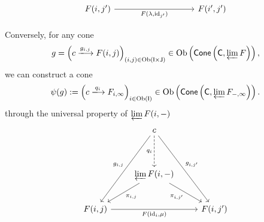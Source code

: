 \begin{prf}
\[\begin{tikzcd}
                                                                                                           &                                                                                                               &                                           &                                                                           &                                                     \\
            {F(i,j')} \arrow[rrrr, "{F(\lambda,\mathrm{id}_{j'})}"']                                       &                                                                                                               &                                           &                                                                           & {F(i',j')}                                         
            \end{tikzcd}
    \]

    \noindent Conversely, for any cone
    $$
    g=\left( c \xlongrightarrow{g_{i,j}} F(i,j)\right)_{(i,j) \in\mathrm{Ob}\left(\mathsf{I}\times \mathsf{J}\right)}\in \mathrm{Ob}\left(\mathsf{Cone}\left(\mathsf{C}, \varprojlim F\right)\right),
    $$
     we can construct a cone
    $$
    \psi(g):=\left( c\xlongrightarrow{q_i} F_{i,\infty}\right)_{i \in\mathrm{Ob}\left(\mathsf{I}\right)}\in \mathrm{Ob}\left(\mathsf{Cone}\left(\mathsf{C}, \varprojlim F_{-,\infty}\right)\right).
    $$
    through the universal property of $\varprojlim F(i,-)$
    \[
        \begin{tikzcd}
            & c \arrow[d, "q_i"', dashed] \arrow[ldd, "{g_{i,j}}"'] \arrow[rdd, "{g_{i,j'}}"] &           \\[+20pt]
            & {\varprojlim F(i,-)} \arrow[ld, "{\pi_{i,j}}"] \arrow[rd, "{\pi_{i,j'}}"']            &           \\ [+5pt]
{F(i,j)} \arrow[rr, "{F(\mathrm{id}_i,\mu)}"'] &                                                                                 & {F(i,j')}
\end{tikzcd}
\]



\end{prf}

